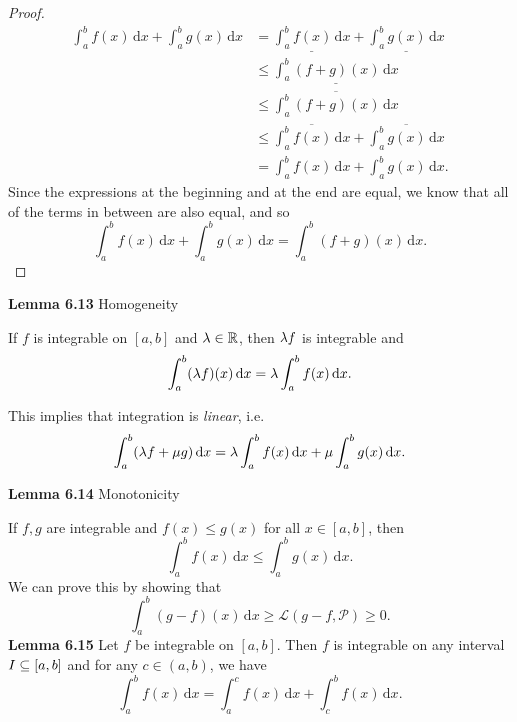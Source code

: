 \documentclass[class=article, crop=false]{standalone}
\begin{document}
\begin{proof}
    \begin{align*}
      \int_{a}^{b}f(x) \,\mathrm dx + \int_{a}^{b}g(x) \,\mathrm dx &= \underline{\int_{a}^{b}f(x) \,\mathrm dx} + \underline{\int_{a}^{b}g(x) \,\mathrm dx} \\
                                                                    &\leq \underline{\int_{a}^{b}(f + g)(x) \,\mathrm dx} \\
                                                                    &\leq \overline{\int_{a}^{b}(f + g)(x) \,\mathrm dx} \\
                                                                    &\leq \overline{\int_{a}^{b}f(x) \,\mathrm dx} + \overline{\int_{a}^{b}g(x) \,\mathrm dx} \\
                                                                    &= \int_{a}^{b}f(x) \,\mathrm dx + \int_{a}^{b}g(x) \,\mathrm dx.
    \end{align*}
    Since the expressions at the beginning and at the end are equal, we know that all of the terms in between are also equal, and so
    \[
      \int_{a}^{b}f(x) \,\mathrm dx + \int_{a}^{b}g(x) \,\mathrm dx = \int_{a}^{b}(f + g)(x) \,\mathrm dx.
    \]
  \end{proof}
  \textbf{Lemma 6.13} Homogeneity \par
  If $f$ is integrable on $[a, b]$ and $\lambda\in\mathbb{R}$, then $\lambda f$ is integrable and
  \[
    \int_{a}^{b}(\lambda f)(x) \,\mathrm dx = \lambda \int_{a}^{b}f(x) \,\mathrm dx.
  \]
  \begin{note}{}
    This implies that integration is \emph{linear}, i.e.
    \[
      \int_{a}^{b}(\lambda f + \mu g) \,\mathrm dx = \lambda \int_{a}^{b}f(x) \,\mathrm dx + \mu \int_{a}^{b}g(x) \,\mathrm dx.
    \]
  \end{note}
  \textbf{Lemma 6.14} Monotonicity \par
  If $f, g$ are integrable and $f(x)\leq g(x)$ for all $x\in [a, b]$, then
  \[
    \int_{a}^{b}f(x) \,\mathrm dx \leq \int_{a}^{b}g(x) \,\mathrm dx.
  \]
  We can prove this by showing that
  \[
    \int_{a}^{b}(g - f)(x) \,\mathrm dx\geq \mathcal{L}(g - f, \mathcal{P})\geq 0.
  \]
  \textbf{Lemma 6.15} Let $f$ be integrable on $[a, b]$. Then $f$ is integrable on any interval $I\subseteq [a, b]$ and for any $c\in (a, b)$, we have
  \[
    \int_{a}^{b}f(x) \,\mathrm dx = \int_{a}^{c}f(x) \,\mathrm dx + \int_{c}^{b}f(x) \,\mathrm dx.
  \]
\end{document}
